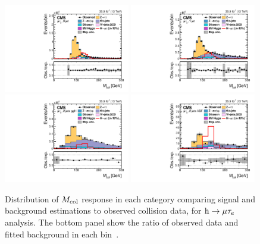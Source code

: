 \begin{figure}[!htpb]\centering
   \captionsetup{width=.98\textwidth,justification=centering}
 \includegraphics[width=0.49\textwidth]{plots_and_figures/chapter8/h125/0jetmcol.pdf}
 \includegraphics[width=0.49\textwidth]{plots_and_figures/chapter8/h125/1jetmcol.pdf} \\
 \includegraphics[width=0.49\textwidth]{plots_and_figures/chapter8/h125/2jetggmcol.pdf}
 \includegraphics[width=0.49\textwidth]{plots_and_figures/chapter8/h125/2jetvbmcol.pdf} 
\caption{Distribution of $M_{\text{col}}$ response in each category comparing signal and background estimations to observed collision data, for $\text{h} \to \mu \tau_{e}$ analysis. The bottom panel show the ratio of observed data and fitted background in each bin~\cite{HIG-17-001}.}
 \label{fig:mcol_dist_hmue}
\end{figure}


